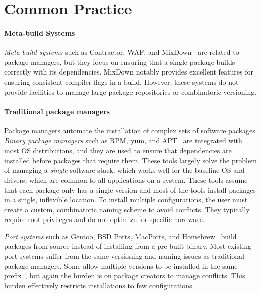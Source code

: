 
\section{Common Practice}
\label{sec:motivation}

\paragraph{Meta-build Systems}
{\it Meta-build systems} such as Contractor, WAF, and
MixDown~\cite{amundson:contractor,epperly+:mixdown,epperly+:mixdown-report,nagy:waf} are
related to package managers, but they focus on ensuring that a single
package builds correctly with its dependencies.  MixDown notably provides excellent
features for ensuring consistent compiler flags in a build.
However, these systems do not provide facilities to manage
large package repositories or combinatoric versioning.

\paragraph{Traditional package managers}
Package managers automate the installation of complex sets of software packages.
{\it Binary package managers} such as RPM, yum, and
APT~\cite{foster+:rpm03,silva:apt01,yum} are integrated with most
OS distributions, and they are used to ensure that dependencies
are installed before packages that require them.
These tools largely solve the problem of managing a {\it single} software
stack, which works well for the baseline OS and drivers, which are
common to all applications on a system.
These tools assume that each package only has a single version
and most of the tools install packages in a single, inflexible location.
To install multiple configurations, the user must create a custom, combinatoric
naming scheme to avoid conflicts. They typically require root
privileges and do not optimize for specific hardware.

{\it Port systems} such as Gentoo, BSD Ports, MacPorts, and
Homebrew~\cite{bsdports,groffen:gentoo-prefix,homebrew,macports,thiruvathukal:gentoo04}
build packages from source instead of installing from a pre-built binary.
Most existing port systems suffer from
the same versioning and naming issues as traditional package managers.
Some allow multiple versions to be installed in the same
prefix~\cite{groffen:gentoo-prefix}, but again the burden is on package
creators to manage conflicts. This burden effectively restricts installations
to few configurations.


